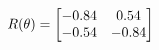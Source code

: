 \documentclass[preview]{standalone}
\begin{document}
\begin{align*}
\special{dvisvgm:raw <g id='unique000'>}R(\theta) = \begin{bmatrix}-0.84 & 0.54\\-0.54 & -0.84\end{bmatrix}\special{dvisvgm:raw </g>}
\end{align*}
\end{document}
